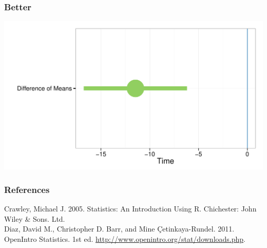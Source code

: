 \documentclass{beamer}\usepackage{graphicx, color}
\makeatletter
\def\maxwidth{ %
  \ifdim\Gin@nat@width>\linewidth
    \linewidth
  \else
    \Gin@nat@width
  \fi
}
\newenvironment{knitrout}{}{} %
\makeatother
\begin{document}
\begin{frame}[fragile]
  \frametitle{Better}
\begin{knitrout}
\color{fgcolor}

{\centering \includegraphics[width=\maxwidth]{figure/PlotCIDiffMeans} 

}


\end{knitrout}

\end{frame}



\begin{frame}[allowframebreaks]
  \frametitle{References}
  Crawley, Michael J. 2005. Statistics: An Introduction Using R. Chichester: John Wiley & Sons. Ltd. \\[0.25cm]
  Diaz, David M., Christopher D. Barr, and Mine \c{C}etinkaya-Rundel. 2011. OpenIntro Statistics. 1st ed. \url{http://www.openintro.org/stat/downloads.php}. \\[0.25cm] 
\end{frame}
\end{document}
